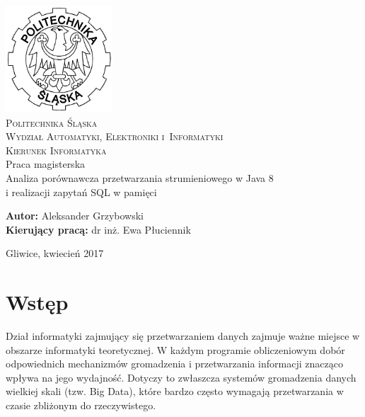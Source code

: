 \documentclass[12pt]{extarticle}
\begin{document}
\begin{titlepage}
    \begin{center}
        \includegraphics[width=4cm]{polsl.png}\\[1cm]
        \textsc{\LARGE{Politechnika Śląska}}\\[0.5cm]
        \textsc{\LARGE{Wydział Automatyki, Elektroniki i~Informatyki}}\\[0.5cm]
        \textsc{\LARGE{Kierunek Informatyka}}\\[2.5cm]
        \LARGE{Praca magisterska}\\[1cm]
        \begingroup
            \fontsize{14pt}{17pt}\selectfont
            Analiza porównawcza przetwarzania strumieniowego w Java 8 \\ i realizacji zapytań SQL w pamięci
        \endgroup
    \end{center}
    \vspace{2cm}
    \begingroup
        \fontsize{14pt}{17pt}\selectfont
        \textbf{Autor:} Aleksander Grzybowski\\
        \textbf{Kierujący pracą:} dr inż. Ewa Płuciennik\\
    \endgroup

    \vspace{2.0cm}
    \begingroup
        \fontsize{12pt}{14pt}\selectfont
        \begin{center}
        Gliwice, kwiecień 2017
        \end{center}
    \endgroup
\end{titlepage}

\clearpage\mbox{}\clearpage

\tableofcontents

\newpage

\section{Wstęp}

	Dział informatyki zajmujący się przetwarzaniem danych zajmuje ważne miejsce w obszarze informatyki teoretycznej. W każdym programie obliczeniowym dobór odpowiednich mechanizmów gromadzenia i przetwarzania informacji znacząco wpływa na jego wydajność. Dotyczy to zwłaszcza systemów gromadzenia danych wielkiej skali (tzw. Big Data), które bardzo często wymagają przetwarzania w czasie zbliżonym do rzeczywistego.
\end{document}
